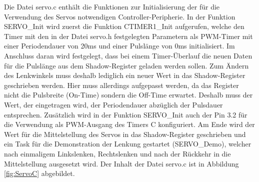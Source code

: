 Die Datei \glqq{}servo.c\grqq{} enthält die Funktionen zur Initialisierung der für die Verwendung des Servos notwendigen Controller-Peripherie. In der Funktion SERVO\_Init wird zuerst die Funktion CTIMER1\_Init aufgerufen, welche den Timer mit den in der Datei \glqq{}servo.h\grqq{} festgelegten Parametern als \ac{PWM}-Timer mit einer Periodendauer von 20ms und einer Pulslänge von 0ms initialisiert. Im Anschluss daran wird festgelegt, dass bei einem Timer-Überlauf die neuen Daten für die Pulslänge aus dem Shadow-Register geladen werden sollen. Zum Ändern des Lenkwinkels muss deshalb lediglich ein neuer Wert in das Shadow-Register geschrieben werden. Hier muss allerdings aufgepasst werden, da das Register nicht die Pulsbreite (On-Time) sondern die Off-Time erwartet. Deshalb muss der Wert, der eingetragen wird, der Periodendauer abzüglich der Pulsdauer entsprechen. Zusätzlich wird in der Funktion SERVO\_Init auch der Pin 3.2 für die Verwendung als \ac{PWM}-Ausgang des Timers C konfiguriert. Am Ende wird der Wert für die Mittelstellung des Servos in das Shadow-Register geschrieben und ein Task für die Demonstration der Lenkung gestartet (SERVO\_Demo), welcher nach einmaligem Linkslenken, Rechtslenken und nach der Rückkehr in die Mittelstellung ausgesetzt wird. Der Inhalt der Datei \glqq{}servo.c\grqq{} ist in Abbildung \ref{fig:ServoC} abgebildet.


\newpage